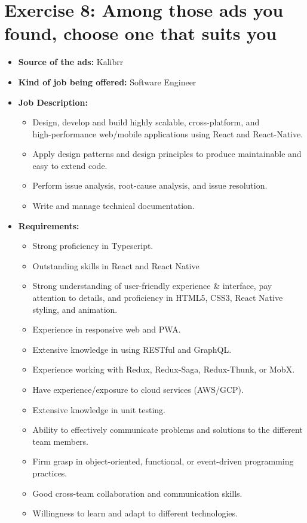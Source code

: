 \documentclass[12pt,titlepage]{article}
\begin{document}
\pagebreak

\section{Exercise 8: Among those ads you found, choose one that suits you}

\begin{itemize}
    \item {
        \textbf{Source of the ads:} Kalibrr
    }
    \item {
        \textbf{Kind of job being offered:} Software Engineer
    }
    \item {
        \textbf{Job Description:}
        \begin{itemize}            
            \item Design, develop and build highly scalable, cross-platform, and \\ high-performance web/mobile applications using React and React-Native.
            \item Apply design patterns and design principles to produce maintainable and easy to extend code.
            \item Perform issue analysis, root-cause analysis, and issue resolution.
            \item Write and manage technical documentation.        
        \end{itemize}
    }
    \item {
        \textbf{Requirements:}
        \begin{itemize}
            \item Strong proficiency in Typescript.
            \item Outstanding skills in React and React Native
            \item Strong understanding of user-friendly experience \& interface, pay attention to details, and proficiency in HTML5, CSS3, React Native styling, and animation.
            \item Experience in responsive web and PWA.
            \item Extensive knowledge in using RESTful and GraphQL.
            \item Experience working with Redux, Redux-Saga, Redux-Thunk, or MobX.
            \item Have experience/exposure to cloud services (AWS/GCP).
            \item Extensive knowledge in unit testing.
            \item Ability to effectively communicate problems and solutions to the different team members.
            \item Firm grasp in object-oriented, functional, or event-driven programming practices.
            \item Good cross-team collaboration and communication skills.
            \item Willingness to learn and adapt to different technologies.        
        \end{itemize}
    }
\end{itemize}
\end{document}
